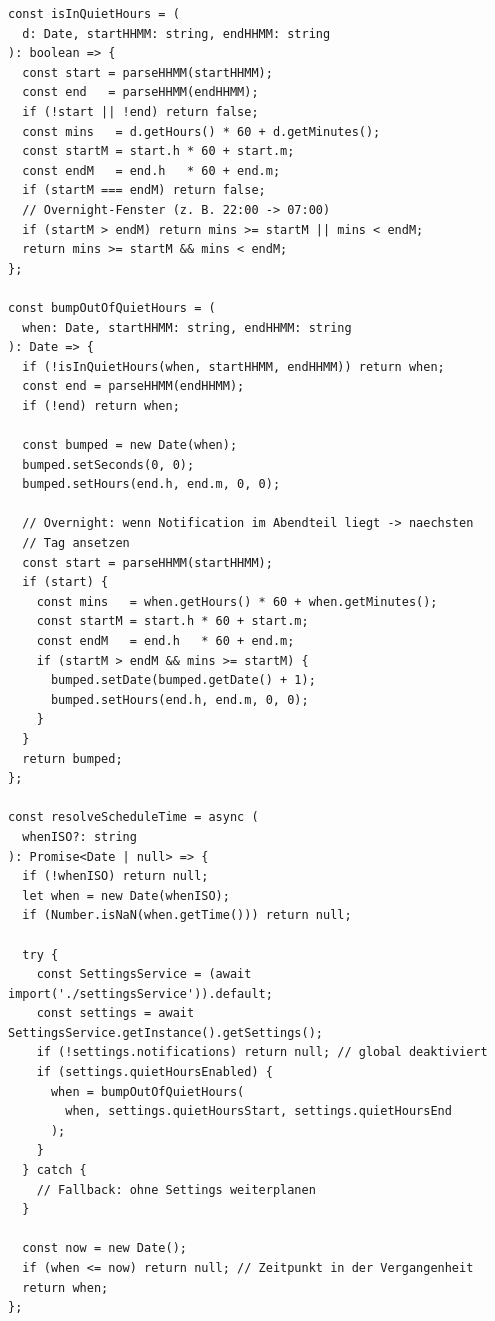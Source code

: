 \begin{lstlisting}[style=skyline-ts,
  caption={Vollstaendige Quiet-Hours-Logik: isInQuietHours, bumpOutOfQuietHours
           und resolveScheduleTime (services/notifications.ts)},
  label={lst:quiet_hours}]
const isInQuietHours = (
  d: Date, startHHMM: string, endHHMM: string
): boolean => {
  const start = parseHHMM(startHHMM);
  const end   = parseHHMM(endHHMM);
  if (!start || !end) return false;
  const mins   = d.getHours() * 60 + d.getMinutes();
  const startM = start.h * 60 + start.m;
  const endM   = end.h   * 60 + end.m;
  if (startM === endM) return false;
  // Overnight-Fenster (z. B. 22:00 -> 07:00)
  if (startM > endM) return mins >= startM || mins < endM;
  return mins >= startM && mins < endM;
};

const bumpOutOfQuietHours = (
  when: Date, startHHMM: string, endHHMM: string
): Date => {
  if (!isInQuietHours(when, startHHMM, endHHMM)) return when;
  const end = parseHHMM(endHHMM);
  if (!end) return when;

  const bumped = new Date(when);
  bumped.setSeconds(0, 0);
  bumped.setHours(end.h, end.m, 0, 0);

  // Overnight: wenn Notification im Abendteil liegt -> naechsten
  // Tag ansetzen
  const start = parseHHMM(startHHMM);
  if (start) {
    const mins   = when.getHours() * 60 + when.getMinutes();
    const startM = start.h * 60 + start.m;
    const endM   = end.h   * 60 + end.m;
    if (startM > endM && mins >= startM) {
      bumped.setDate(bumped.getDate() + 1);
      bumped.setHours(end.h, end.m, 0, 0);
    }
  }
  return bumped;
};

const resolveScheduleTime = async (
  whenISO?: string
): Promise<Date | null> => {
  if (!whenISO) return null;
  let when = new Date(whenISO);
  if (Number.isNaN(when.getTime())) return null;

  try {
    const SettingsService = (await import('./settingsService')).default;
    const settings = await SettingsService.getInstance().getSettings();
    if (!settings.notifications) return null; // global deaktiviert
    if (settings.quietHoursEnabled) {
      when = bumpOutOfQuietHours(
        when, settings.quietHoursStart, settings.quietHoursEnd
      );
    }
  } catch {
    // Fallback: ohne Settings weiterplanen
  }

  const now = new Date();
  if (when <= now) return null; // Zeitpunkt in der Vergangenheit
  return when;
};
\end{lstlisting}

